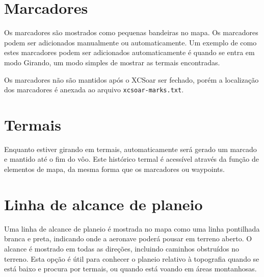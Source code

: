 \section{Marcadores}\label{sec:markers}

Os marcadores são mostrados como pequenas bandeiras no mapa.  Os marcadores podem ser adicionados manualmente ou automaticamente.  Um exemplo de como estes marcadores podem ser adicionados automaticamente é quando se entra em modo Girando, um modo simples de mostrar as termais encontradas.

Os marcadores não são mantidos após o XCSoar ser fechado, porém a localização dos marcadores é anexada ao arquivo
 \verb|xcsoar-marks.txt|.

\section{Termais}

Enquanto estiver girando em termais, automaticamente será gerado um marcado e mantido até o 
fim do vôo.  Este histórico termal é acessível através da função de elementos de mapa, da 
mesma forma que os marcadores ou waypoints.


\section{Linha de alcance de planeio}\label{sec:reach}

Uma linha de alcance de planeio é mostrada no mapa como uma linha pontilhada branca e 
preta, indicando onde a aeronave poderá pousar em terreno aberto.  O alcance é mostrado 
em todas as direções, incluindo caminhos obstruídos no terreno.  Esta opção é útil para 
conhecer o planeio relativo à topografia quando se está baixo e procura por termais, ou 
quando está voando em áreas montanhosas.

